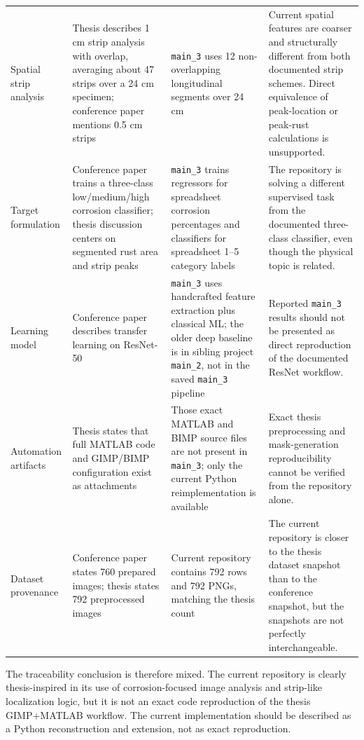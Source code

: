\documentclass[11pt,a4paper]{article}
\begin{document}
\begin{longtable}{P{3.8cm}P{4.1cm}P{4.0cm}P{3.7cm}}
Spatial strip analysis & Thesis describes 1 cm strip analysis with overlap, averaging about 47 strips over a 24 cm specimen; conference paper mentions 0.5 cm strips & \texttt{main\_3} uses 12 non-overlapping longitudinal segments over 24 cm & Current spatial features are coarser and structurally different from both documented strip schemes. Direct equivalence of peak-location or peak-rust calculations is unsupported. \\
Target formulation & Conference paper trains a three-class low/medium/high corrosion classifier; thesis discussion centers on segmented rust area and strip peaks & \texttt{main\_3} trains regressors for spreadsheet corrosion percentages and classifiers for spreadsheet 1--5 category labels & The repository is solving a different supervised task from the documented three-class classifier, even though the physical topic is related. \\
Learning model & Conference paper describes transfer learning on ResNet-50 & \texttt{main\_3} uses handcrafted feature extraction plus classical ML; the older deep baseline is in sibling project \texttt{main\_2}, not in the saved \texttt{main\_3} pipeline & Reported \texttt{main\_3} results should not be presented as direct reproduction of the documented ResNet workflow. \\
Automation artifacts & Thesis states that full MATLAB code and GIMP/BIMP configuration exist as attachments & Those exact MATLAB and BIMP source files are not present in \texttt{main\_3}; only the current Python reimplementation is available & Exact thesis preprocessing and mask-generation reproducibility cannot be verified from the repository alone. \\
Dataset provenance & Conference paper states 760 prepared images; thesis states 792 preprocessed images & Current repository contains 792 rows and 792 PNGs, matching the thesis count & The current repository is closer to the thesis dataset snapshot than to the conference snapshot, but the snapshots are not perfectly interchangeable. \\
\end{longtable}

The traceability conclusion is therefore mixed. The current repository is clearly thesis-inspired in its use of corrosion-focused image analysis and strip-like localization logic, but it is not an exact code reproduction of the thesis GIMP+MATLAB workflow. The current implementation should be described as a Python reconstruction and extension, not as exact reproduction.
\end{document}
